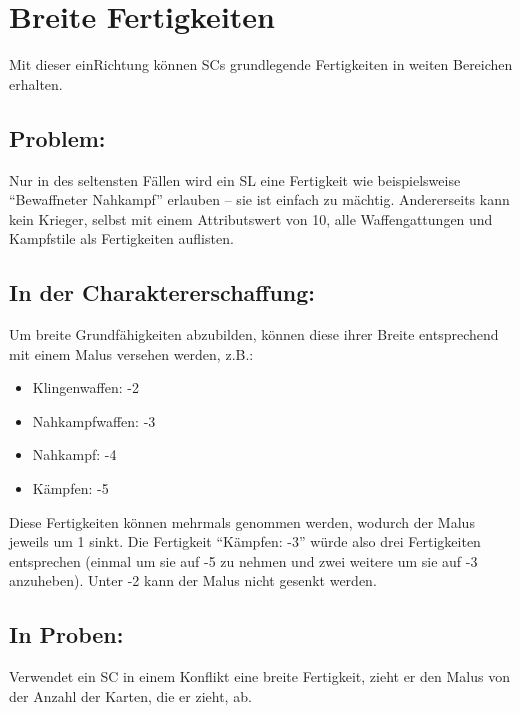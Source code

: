 \section{Breite Fertigkeiten}
Mit dieser einRichtung können SCs grundlegende Fertigkeiten in weiten Bereichen erhalten.
\subsection{Problem:}
Nur in des seltensten Fällen wird ein SL eine Fertigkeit wie beispielsweise "`Bewaffneter Nahkampf"' erlauben -- sie ist einfach zu mächtig. Andererseits kann kein Krieger, selbst mit einem Attributswert von 10, alle Waffengattungen und Kampfstile als Fertigkeiten auflisten.

\subsection{In der Charaktererschaffung:}
Um breite Grundfähigkeiten abzubilden, können diese ihrer Breite entsprechend mit einem Malus versehen werden, z.B.:
\begin{itemize}
\item Klingenwaffen: -2
\item Nahkampfwaffen: -3
\item Nahkampf: -4
\item Kämpfen: -5
\end{itemize}
Diese Fertigkeiten können mehrmals genommen werden, wodurch der Malus jeweils um 1 sinkt. Die Fertigkeit "`Kämpfen: -3"' würde also drei Fertigkeiten entsprechen (einmal um sie auf -5 zu nehmen und zwei weitere um sie auf -3 anzuheben). Unter -2 kann der Malus nicht gesenkt werden.

\subsection{In Proben:}
Verwendet ein SC in einem Konflikt eine breite Fertigkeit, zieht er den Malus von der Anzahl der Karten, die er zieht, ab.


